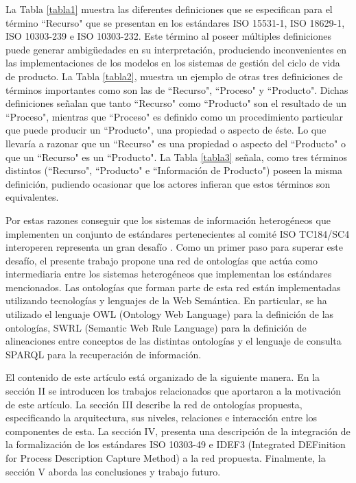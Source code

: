 \documentclass[journal]{IEEEtran}
\begin{document}
La Tabla \ref{tabla1} muestra las diferentes definiciones que se especifican para el t\'ermino ``Recurso" que se presentan en los est\'andares ISO 15531-1, ISO 18629-1, ISO 10303-239 e ISO 10303-232. Este t\'ermino al poseer m\'ultiples definiciones puede generar ambig\"uedades en su interpretaci\'on, produciendo inconvenientes en las implementaciones de los modelos en los sistemas de gesti\'on del ciclo de vida de producto. La Tabla \ref{tabla2}, muestra un ejemplo de otras tres definiciones de t\'erminos importantes como son las de ``Recurso", ``Proceso" y ``Producto". Dichas definiciones se\~nalan que tanto ``Recurso" como ``Producto" son el resultado de un ``Proceso", mientras que ``Proceso" es definido como un procedimiento particular que puede producir un ``Producto", una propiedad o aspecto de \'este. Lo que llevar\'ia a razonar que un ``Recurso" es una propiedad o aspecto del ``Producto" o que un ``Recurso" es un ``Producto". La Tabla \ref{tabla3} se\~nala, como tres t\'erminos distintos (``Recurso", ``Producto" e ``Informaci\'on de Producto") poseen la misma definici\'on, pudiendo ocasionar que los actores infieran que estos t\'erminos son equivalentes.

Por estas razones conseguir que los sistemas de informaci\'on heterog\'eneos que implementen un conjunto de est\'andares pertenecientes al comit\'e ISO TC184/SC4 interoperen representa un gran desaf\'io \cite{Fortineau2013}. Como un primer paso para superar este desaf\'io, el presente trabajo propone una red de ontolog\'ias que act\'ua como intermediaria entre los sistemas heterog\'eneos que implementan los est\'andares mencionados. Las ontolog\'ias que forman parte de esta red est\'an implementadas utilizando tecnolog\'ias y lenguajes de la Web Sem\'antica. En particular, se ha utilizado el lenguaje OWL (Ontology Web Language) para la definici\'on de las ontolog\'ias, SWRL (Semantic Web Rule Language) para la definici\'on de alineaciones entre conceptos de las distintas ontolog\'ias y el lenguaje de consulta SPARQL para la recuperaci\'on de informaci\'on.

El contenido de este art\'iculo est\'a organizado de la siguiente manera. En la secci\'on II se introducen los trabajos relacionados que aportaron a la motivaci\'on de este art\'iculo. La secci\'on III describe la red de ontolog\'ias propuesta, especificando la arquitectura, sus niveles, relaciones e interacci\'on entre los componentes de esta. La secci\'on IV, presenta una descripci\'on de la integraci\'on de la formalizaci\'on de los est\'andares ISO 10303-49 e IDEF3 (Integrated DEFinition for Process Description Capture Method) a la red propuesta. Finalmente, la secci\'on V aborda las conclusiones y trabajo futuro.
\end{document}
